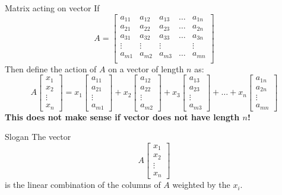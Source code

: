 \documentclass{beamer}
\begin{document}
\begin{frame}{Matrix acting on vector}
  If
  \begin{equation*}
      A=\left[
        \begin{array}{ccccc}
          a_{11} & a_{12} & a_{13} & \ldots & a_{1n} \\
          a_{21} & a_{22} & a_{23} & \ldots & a_{2n} \\
          a_{31} & a_{32} & a_{33} & \ldots & a_{3n} \\
          \vdots & \vdots & \vdots & & \vdots \\
          a_{m1} & a_{m2} & a_{m3} & \ldots & a_{mn} \\
        \end{array}
      \right]
    \end{equation*}
  Then define the action of $A$ on a vector of length $n$ as:
  \begin{equation*}
    A\left[\begin{array}{c} x_1 \\ x_2 \\ \vdots \\ x_n\end{array} \right] = x_1 \left[\begin{array}{c} a_{11} \\ a_{21} \\ \vdots \\a_{m1}\end{array} \right]+x_2 \left[\begin{array}{c} a_{12} \\ a_{22} \\ \vdots \\a_{m2}\end{array} \right]+ x_3\left[\begin{array}{c} a_{13} \\ a_{23} \\ \vdots \\a_{m3}\end{array} \right] + \dots + x_n\left[\begin{array}{c} a_{1n} \\ a_{2n} \\ \vdots \\a_{mn}\end{array} \right]
  \end{equation*}
  \bf{This does not make sense if vector does not have length $n$!}
\end{frame}


\begin{frame}{Slogan}
  The vector
  \begin{equation*}
    A \left[\begin{array}{c} x_1 \\ x_2 \\ \vdots \\ x_n\end{array} \right]
  \end{equation*}
  is the linear combination of the columns of $A$ weighted by the $x_i$.
\end{frame}
\end{document}
